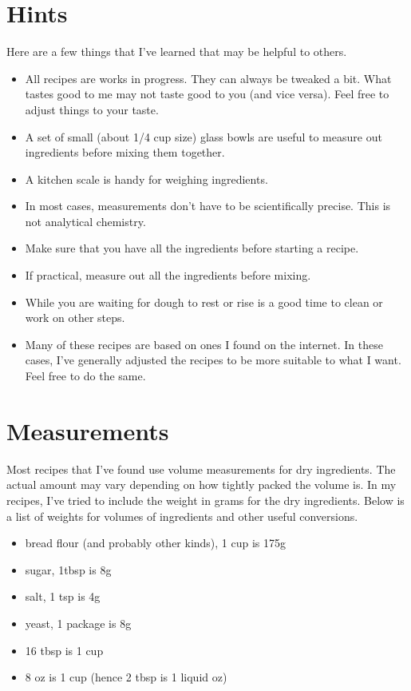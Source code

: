 \documentclass[10pt, openany]{book}
\begin{document}
\section{Hints}
Here are a few things that I've learned that may be helpful to others.
\begin{itemize}
  \item All recipes are works in progress.  They can always be tweaked a bit.  What tastes good to me may not taste good to you (and vice versa).  Feel free to adjust things to your taste.
  \item A set of small (about 1/4 cup size) glass bowls are useful to measure out ingredients before mixing them together.
  \item A kitchen scale is handy for weighing ingredients.
  \item In most cases, measurements don't have to be scientifically precise.  This is not analytical chemistry.
  \item Make sure that you have all the ingredients before starting a recipe.
  \item If practical, measure out all the ingredients before mixing.
  \item While you are waiting for dough to rest or rise is a good time to clean or work on other steps.
  \item Many of these recipes are based on ones I found on the internet.  In these cases, I've generally adjusted the recipes to be more suitable to what I want.  Feel free to do the same.
\end{itemize}

\section{Measurements}
Most recipes that I've found use volume measurements for dry ingredients.  The actual amount may vary depending on how tightly packed the volume is.  In my recipes, I've tried to include the weight in grams for the dry ingredients.  Below is a list of weights for volumes of ingredients and other useful conversions.
\begin{itemize}
  \item bread flour (and probably other kinds), 1 cup is 175g
  \item sugar, 1tbsp is 8g
  \item salt, 1 tsp is 4g
  \item yeast, 1 package is 8g
  \item 16 tbsp is 1 cup
  \item 8 oz is 1 cup (hence 2 tbsp is 1 liquid oz)
\end{itemize}
\end{document}
